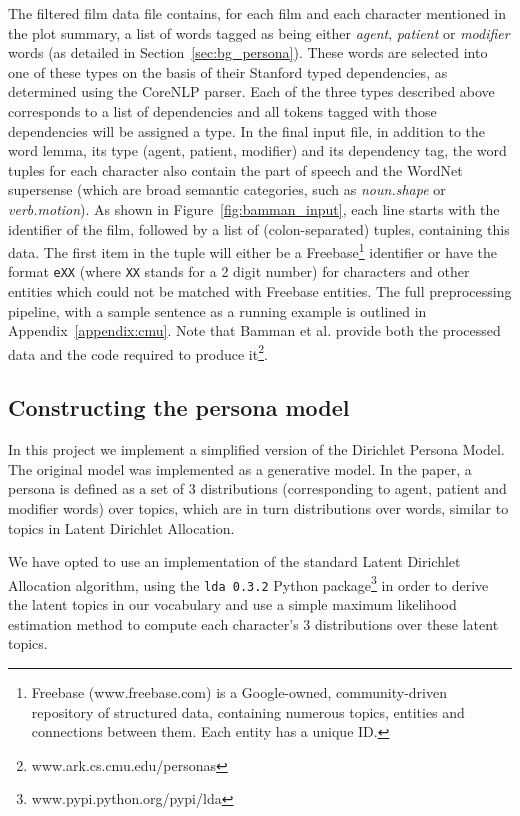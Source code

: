 \documentclass[bsc,frontabs,deptreport,singlespacing,parskip, twoside]{infthesis}
\begin{document}
The filtered film data file contains, for each film and each character mentioned in the plot summary, a list of words tagged as being either \textit{agent}, \textit{patient} or \textit{modifier} words (as detailed in Section~\ref{sec:bg_persona}). These words are selected into one of these types on the basis of their Stanford typed dependencies, as determined using the CoreNLP parser. Each of the three types described above corresponds to a list of dependencies and all tokens tagged with those dependencies will be assigned a type. In the final input file, in addition to the word lemma, its type (agent, patient, modifier) and its dependency tag, the word tuples for each character also contain the part of speech and the WordNet supersense (which are broad semantic categories, such as \textit{noun.shape} or \textit{verb.motion}). As shown in Figure~\ref{fig:bamman_input}, each line starts with the identifier of the film, followed by a list of (colon-separated) tuples, containing this data. The first item in the tuple will either be a Freebase\footnote{Freebase (www.freebase.com) is a Google-owned, community-driven repository of structured data, containing numerous topics, entities and connections between them. Each entity has a unique ID.} identifier or have the format \texttt{eXX} (where \texttt{XX} stands for a 2 digit number) for characters and other entities which could not be matched with Freebase entities. The full preprocessing pipeline, with a sample sentence as a running example is outlined in Appendix~\ref{appendix:cmu}. Note that Bamman et al. provide both the processed data and the code required to produce it\footnote{www.ark.cs.cmu.edu/personas}.


\subsection{Constructing the persona model}
In this project we implement a simplified version of the Dirichlet Persona Model. The original model was implemented as a generative model. In the paper, a persona is defined as a set of 3 distributions (corresponding to agent, patient and modifier words) over topics, which are in turn distributions over words, similar to topics in Latent Dirichlet Allocation.

We have opted to use an implementation of the standard Latent Dirichlet Allocation \cite{Blei2003} algorithm, using the \texttt{lda 0.3.2} Python package\footnote{ www.pypi.python.org/pypi/lda} in order to derive the latent topics in our vocabulary and use a simple maximum likelihood estimation method to compute each character's 3 distributions over these latent topics.
\end{document}
